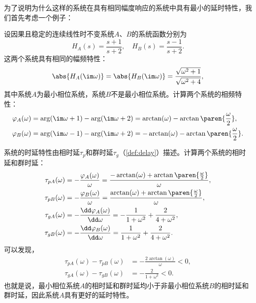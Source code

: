 为了说明为什么这样的系统在具有相同幅度响应的系统中具有最小的延时特性，我们首先考虑一个例子：
\begin{example}
    设因果且稳定的连续线性时不变系统$A$、$B$的系统函数分别为
    \begin{equation}
        H_A(s)=\frac{s+1}{s+2},\quad H_B(s)=\frac{s-1}{s+2}.
    \end{equation}
    这两个系统具有相同的幅频特性：
    \begin{equation}
        \abs{H_A(\im\omega)}=\abs{H_B(\im\omega)}=\frac{\sqrt{\omega^2+1}}{\sqrt{\omega^2+4}},
    \end{equation}
    其中系统$A$为最小相位系统，系统$B$不是最小相位系统。计算两个系统的相频特性：
    \begin{align}
        \varphi_A(\omega)&=\arg(\im\omega+1)-\arg(\im\omega+2)=\arctan(\omega)-\arctan\paren{\frac{\omega}{2}},\\
        \varphi_B(\omega)&=\arg(\im\omega-1)-\arg(\im\omega+2)=-\arctan(\omega)-\arctan\paren{\frac{\omega}{2}}.
    \end{align}

    系统的时延特性由相时延$\tau_p$和群时延$\tau_g$（\cref{def:delay}）描述。计算两个系统的相时延和群时延：
    \begin{align}
        \tau_{pA}(\omega)&=-\frac{\varphi_A(\omega)}{\omega}=\frac{-\arctan(\omega)+\arctan\paren{\frac{\omega}{2}}}{\omega},\\
        \tau_{pB}(\omega)&=-\frac{\varphi_B(\omega)}{\omega}=\frac{\arctan(\omega)+\arctan\paren{\frac{\omega}{2}}}{\omega},\\
        \tau_{gA}(\omega)&=-\frac{\dd\varphi_A(\omega)}{\dd\omega}=-\frac{1}{1+\omega^2}+\frac{2}{4+\omega^2},\\
        \tau_{gB}(\omega)&=-\frac{\dd\varphi_B(\omega)}{\dd\omega}=\frac{1}{1+\omega^2}+\frac{2}{4+\omega^2}.
    \end{align}
    可以发现，
    \begin{align}
        \tau_{pA}(\omega)-\tau_{pB}(\omega)&=-\frac{2\arctan(\omega)}{\omega}<0,\\
        \tau_{gA}(\omega)-\tau_{gB}(\omega)&=-\frac{2}{1+\omega^2}<0.
    \end{align}
    也就是说，最小相位系统$A$的相时延和群时延均小于非最小相位系统$B$的相时延和群时延，因此系统$A$具有更好的延时特性。
\end{example}

